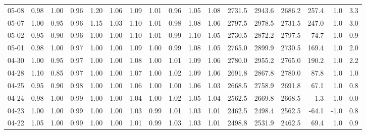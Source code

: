 \begin{threeparttable}
{\begin{tabular}{lrrrrrrrrrrrrrrrr}
  05-08 &   0.98 &   1.00 &         0.96 &     1.20 &           1.06 &        1.09 &        1.01 &        0.96 &          1.05 &          1.08 & 2731.5 & 2943.6 & 2686.2 &      257.4 &                      1.0 &                 3.3 \\
  05-07 &   1.00 &   0.95 &         0.96 &     1.15 &           1.03 &        1.10 &        1.01 &        0.98 &          1.08 &          1.06 & 2797.5 & 2978.5 & 2731.5 &      247.0 &                      1.0 &                 3.0 \\
  05-02 &   0.95 &   0.90 &         0.96 &     1.00 &           1.00 &        1.10 &        1.01 &        0.99 &          1.10 &          1.05 & 2730.5 & 2872.2 & 2797.5 &       74.7 &                      1.0 &                 0.9 \\
  05-01 &   0.98 &   1.00 &         0.97 &     1.00 &           1.00 &        1.09 &        1.00 &        0.99 &          1.08 &          1.05 & 2765.0 & 2899.9 & 2730.5 &      169.4 &                      1.0 &                 2.0 \\
  04-30 &   1.00 &   0.95 &         0.97 &     1.00 &           1.00 &        1.08 &        1.00 &        1.01 &          1.09 &          1.06 & 2780.0 & 2955.2 & 2765.0 &      190.2 &                      1.0 &                 2.2 \\
  04-28 &   1.10 &   0.85 &         0.97 &     1.00 &           1.00 &        1.07 &        1.00 &        1.02 &          1.09 &          1.06 & 2691.8 & 2867.8 & 2780.0 &       87.8 &                      1.0 &                 1.0 \\
  04-25 &   0.95 &   0.90 &         0.98 &     1.00 &           1.00 &        1.06 &        1.00 &        1.00 &          1.06 &          1.03 & 2668.5 & 2758.9 & 2691.8 &       67.1 &                      1.0 &                 0.8 \\
  04-24 &   0.98 &   1.00 &         0.99 &     1.00 &           1.00 &        1.04 &        1.00 &        1.02 &          1.05 &          1.04 & 2562.5 & 2669.8 & 2668.5 &        1.3 &                      1.0 &                 0.0 \\
  04-23 &   1.00 &   1.00 &         0.99 &     1.00 &           1.00 &        1.03 &        0.99 &        1.01 &          1.03 &          1.01 & 2462.5 & 2498.4 & 2562.5 &      -64.1 &                     -1.0 &                 0.8 \\
  04-22 &   1.05 &   1.00 &         0.99 &     1.00 &           1.00 &        1.01 &        0.99 &        1.03 &          1.03 &          1.01 & 2498.8 & 2531.9 & 2462.5 &       69.4 &                      1.0 &                 0.9 \\

\end{tabular}}
\end{threeparttable}
